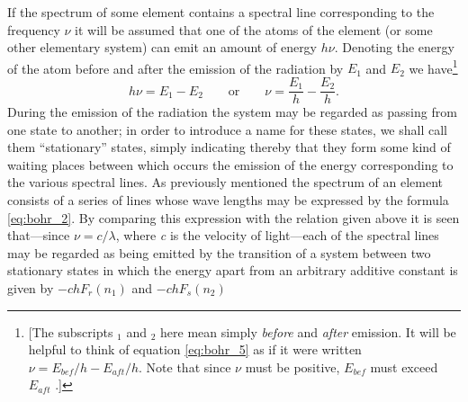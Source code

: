 If the spectrum of some element contains a spectral line corresponding
to the frequency $\nu$ it will be assumed that one of the atoms of
the element (or some other elementary system) can emit an amount of
energy $h\nu$. Denoting the energy of the atom before and after the
emission of the radiation by $E_1$ and $E_2$ we have\footnote{{[}The
  subscripts $_1$ and $_2$ here mean simply \emph{before} and \emph{after}
  emission. It will be helpful to think of equation \eqref{eq:bohr_5} as if it were
  written $\nu = E_{bef}/h - E_{aft}/h$. 
Note that since $\nu$ must be positive, $E_{bef}$ must exceed $E_{aft}$ .{]}}
%
\begin{equation}\label{eq:bohr_5}
h\nu = E_1 - E_2 \qquad \text{or} \qquad \nu = \frac{E_1}{h} - \frac{E_2}{h} .
\end{equation}
%
During the emission of the radiation the system may be regarded as
passing from one state to another; in order to introduce a name for
these states, we shall call them ``stationary'' states, simply
indicating thereby that they form some kind of waiting places between
which occurs the emission of the energy corresponding to the various
spectral lines. As previously mentioned the spectrum of an element
consists of a series of lines whose wave lengths may be expressed by the
formula \eqref{eq:bohr_2}. By comparing this expression with the relation given above
it is seen that---since $\nu = c/\lambda$, where \emph{c} is the
velocity of light---each of the spectral lines may be regarded as being
emitted by the transition of a system between two stationary states in
which the energy apart from an arbitrary additive constant is given by
$-chF_r(n_1)$ and $-chF_s(n_2)$
